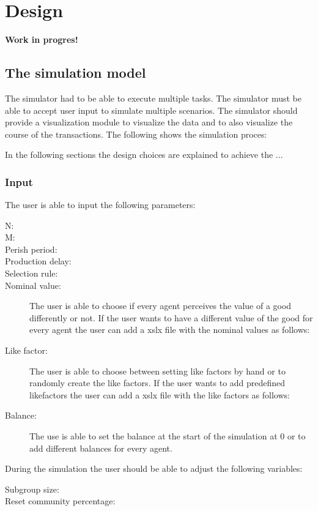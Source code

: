 \documentclass[twoside,openright]{uva-bachelor-thesis}
\begin{document}
\chapter{Design}
\textbf{Work in progres!}
\section{The simulation model}
The simulator had to be able to execute multiple tasks. The simulator must be able to accept user input to simulate multiple scenarios. The simulator should provide a visualization module to visualize the data and to also visualize the course of the transactions. The following shows the simulation proces:

In the following sections the design choices are explained to achieve the ...
\subsection{Input}
The user is able to input the following parameters:

\begin{description}
  \item[N:] 
  \item[M:] 
  \item[Perish period:] 
  \item[Production delay:]
 \item[Selection rule:] 
  \item[Nominal value:] The user is able to choose if every agent perceives the value of a good differently or not. If the user wants to have a different value of the good for every agent the user can add a xslx file with the nominal values as follows:
  \item[Like factor:] The user is able to choose between setting like factors by hand or to randomly create the like factors. If the user wants to add predefined likefactors the user can add a xslx file with the like factors as follows:
 \item[Balance:] The use is able to set the balance at the start of the simulation at 0 or to add different balances for every agent.
\end{description}
During the simulation the user should be able to adjust the following variables:

\begin{description}
  \item[Subgroup size:] 
  \item[Reset community percentage:] 

\end{description}
\end{document}
